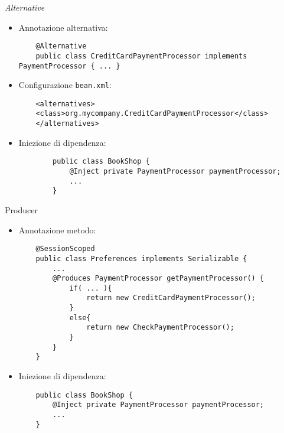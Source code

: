 \begin{frame}[fragile]{\textsl{Alternative}}

\begin{itemize}
\item Annotazione alternativa:
	\begin{lstlisting}
	@Alternative
	public class CreditCardPaymentProcessor implements PaymentProcessor { ... }
	\end{lstlisting}


\item Configurazione \texttt{bean.xml}:
	\begin{lstlisting}
	<alternatives>
	<class>org.mycompany.CreditCardPaymentProcessor</class>
	</alternatives>
	\end{lstlisting}

\item Iniezione di dipendenza:
	\begin{lstlisting}
		public class BookShop {
		    @Inject private PaymentProcessor paymentProcessor;
		    ...
		}
	\end{lstlisting}

\end{itemize}


\end{frame}





\begin{frame}[fragile]{Producer}

\begin{itemize}
\item Annotazione metodo:
	\begin{lstlisting}
	@SessionScoped
	public class Preferences implements Serializable {
	    ...
	    @Produces PaymentProcessor getPaymentProcessor() {
	        if( ... ){
	            return new CreditCardPaymentProcessor();
	        }
	        else{
	            return new CheckPaymentProcessor();
	        }
	    }
	}
	\end{lstlisting}


\item Iniezione di dipendenza:
	\begin{lstlisting}
	public class BookShop {
	    @Inject private PaymentProcessor paymentProcessor;
	    ...
	}
	\end{lstlisting}

\end{itemize}

\end{frame}



